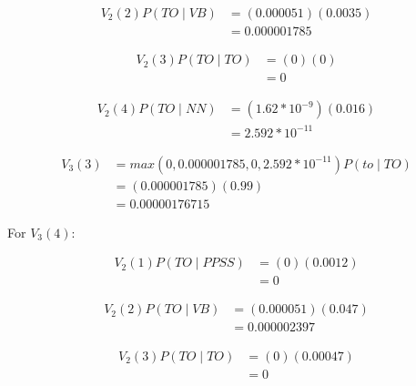 \documentclass[10pt,a4paper]{article}
\begin{document}
\begin{equation}
\begin{split}
V_2(2)P(TO\mid VB) &= (0.000051)(0.0035) \\
 &= 0.000001785
\end{split}
\end{equation}

\begin{equation}
\begin{split}
V_2(3)P(TO\mid TO) &= (0)(0) \\
&= 0
\end{split}
\end{equation}

\begin{equation}
\begin{split}
V_2(4)P(TO\mid NN) &= (1.62*10^{-9})(0.016) \\
 &= 2.592*10^{-11}
\end{split}
\end{equation}

\begin{equation}
\begin{split}
V_3(3) &= max(0,0.000001785,0,2.592*10^{-11})P(to\mid TO) \\
 &=(0.000001785)(0.99) \\
 &=0.00000176715
\end{split}
\end{equation}

For $V_3(4):$

\begin{equation}
\begin{split}
V_2(1)P(TO\mid PPSS) &= (0)(0.0012) \\
&= 0
\end{split}
\end{equation}

\begin{equation}
\begin{split}
V_2(2)P(TO\mid VB) &= (0.000051)(0.047) \\
 &= 0.000002397
\end{split}
\end{equation}

\begin{equation}
\begin{split}
V_2(3)P(TO\mid TO) &= (0)(0.00047) \\
&= 0
\end{split}
\end{equation}
\end{document}
